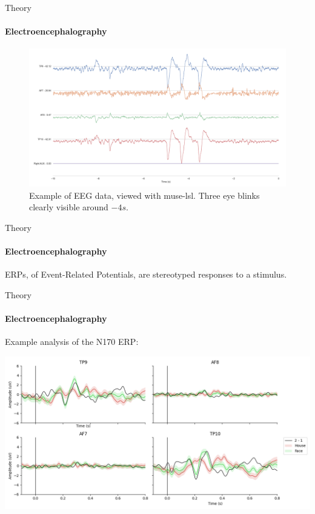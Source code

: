\documentclass[xcolor={dvipsnames,table},12pt]{beamer}
\newif\ifplacelogo{}  %
\begin{document}
\placelogofalse{}
\begin{frame}{Theory}
    \framesubtitle{Electroencephalography}
    \vspace*{-5mm}

    \begin{figure}
        \hspace*{-10mm}
        \includegraphics[width=\paperwidth]{img/muselsl-signal.png}
        \caption{Example of EEG data, viewed with muse-lsl. Three eye blinks clearly visible around $-4s$.}
    \end{figure}
\end{frame}
\placelogotrue{}

\begin{frame}{Theory}
    \framesubtitle{Electroencephalography}
    ERPs, of Event-Related Potentials, are stereotyped responses to a stimulus.

    \begin{adjustbox}{width=\textwidth,center,float=table}
        
    \end{adjustbox}
\end{frame}

\placelogofalse{}
\begin{frame}{Theory}
    \framesubtitle{Electroencephalography}
    Example analysis of the N170 ERP:
    
    \begin{adjustbox}{width=\textwidth,center,float=figure}
        \includegraphics[width=\textwidth]{img/n170_viz.png}
    \end{adjustbox}
\end{frame}
\placelogotrue{}
\end{document}

